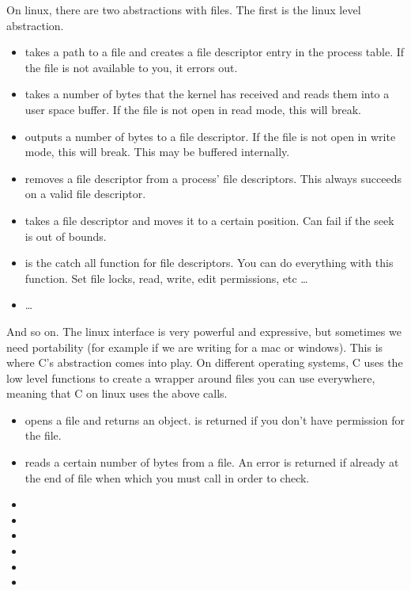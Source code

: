  On linux, there are two abstractions with files. The first is the linux  level abstraction.

 \begin{itemize}
\item {} takes a path to a file and creates a file descriptor entry in the process table. If the file is not available to you, it errors out.
\item {} takes a number of bytes that the kernel has received and reads them into a user space buffer. If the file is not open in read mode, this will break.
\item {} outputs a number of bytes to a file descriptor. If the file is not open in write mode, this will break. This may be buffered internally.
\item {} removes a file descriptor from a process' file descriptors. This always succeeds on a valid file descriptor.
\item {} takes a file descriptor and moves it to a certain position. Can fail if the seek is out of bounds.
\item {} is the catch all function for file descriptors. You can do everything with this function. Set file locks, read, write, edit permissions, etc \ldots{}
\item \ldots{}
 \end{itemize}

 And so on. The linux interface is very powerful and expressive, but sometimes we need portability (for example if we are writing for a mac or windows). This is where C's abstraction comes into play. On different operating systems, C uses the low level functions to create a wrapper around files you can use everywhere, meaning that C on linux uses the above calls.

\begin{itemize}
\item {} opens a file and returns an object.  is returned if you don't have permission for the file.
\item {} reads a certain number of bytes from a file. An error is returned if already at the end of file when which you must call  in order to check.
\item {}
\item {} 
\item {} 
\item {} 
\item {} 
\item {}
\end{itemize}

